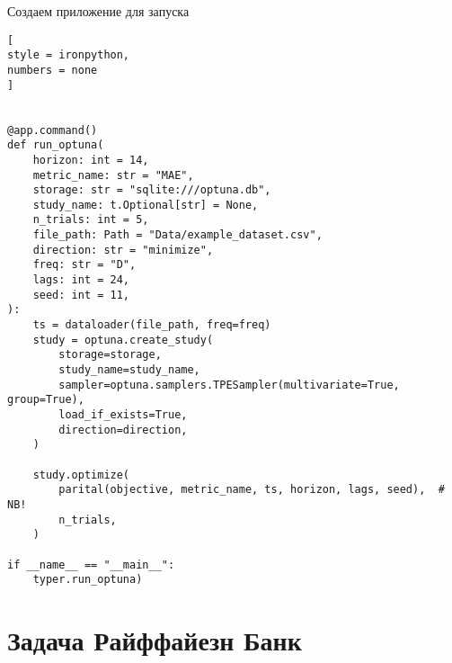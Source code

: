 \documentclass[%
	11pt,
	a4paper,
	utf8,
		]{article}
\begin{document}
Создаем приложение для запуска
\begin{lstlisting}[
style = ironpython,
numbers = none
]


@app.command()
def run_optuna(
    horizon: int = 14,
    metric_name: str = "MAE",
    storage: str = "sqlite:///optuna.db",
    study_name: t.Optional[str] = None,
    n_trials: int = 5,
    file_path: Path = "Data/example_dataset.csv",
    direction: str = "minimize",
    freq: str = "D",
    lags: int = 24,
    seed: int = 11,
):
    ts = dataloader(file_path, freq=freq)
    study = optuna.create_study(
        storage=storage,
        study_name=study_name,
        sampler=optuna.samplers.TPESampler(multivariate=True, group=True),
        load_if_exists=True,
        direction=direction,
    )
    
    study.optimize(
        parital(objective, metric_name, ts, horizon, lags, seed),  # NB!
        n_trials,
    )
    
if __name__ == "__main__":
    typer.run_optuna)
\end{lstlisting}

\section{Задача Райффайезн Банк}
\end{document}

